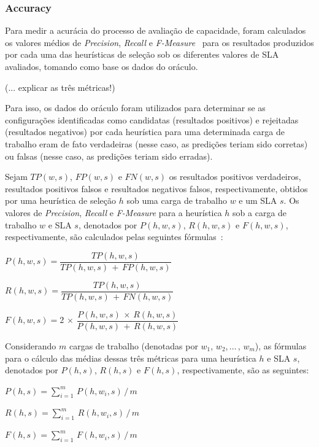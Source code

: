 \documentclass[10pt,conference,compsocconf]{IEEEtran}
\begin{document}
\subsubsection{Accuracy}

\unboldmath

Para medir a acurácia do processo de avaliação de capacidade, foram calculados os valores médios de \emph{Precision}, \emph{Recall} e \emph{F-Measure}~\cite{Baeza-Yates1999} para os resultados produzidos por cada uma das heurísticas de seleção sob os diferentes valores de SLA avaliados, tomando como base os dados do oráculo.  

(... explicar as três métricas!)

Para isso, os dados do oráculo foram utilizados para determinar se as configurações identificadas como candidatas (resultados positivos) e rejeitadas (resultados negativos) por cada heurística para uma determinada carga de trabalho eram de fato verdadeiras (nesse caso, as predições teriam sido corretas) ou falsas (nesse caso, as predições teriam sido erradas).

Sejam $TP(w,s)$, $FP(w,s)$ e $FN(w,s)$ os resultados positivos verdadeiros, resultados positivos falsos e resultados negativos falsos, respectivamente, obtidos por uma heurística de seleção $h$ sob uma carga de trabalho $w$ e um SLA $s$. Os valores de \emph{Precision}, \emph{Recall} e \emph{F-Measure} para a heurística $h$ sob a carga de trabalho $w$ e SLA $s$, denotados por $P(h,w,s)$, $R(h,w,s)$ e $F(h,w,s)$, respectivamente, são calculados pelas seguintes fórmulas~\cite{Baeza-Yates1999}:

{\scriptsize
  $P(h,w,s) = \dfrac{TP(h,w,s)}{TP(h,w,s)\,+\,FP(h,w,s)}$
  
 \smallskip
 $R(h,w,s) = \dfrac{TP(h,w,s)}{TP(h,w,s)\,+\,FN(h,w,s)}$
 
 \smallskip
  $F(h,w,s) = 2\,\times\,\dfrac{P(h,w,s)\,\times\,R(h,w,s)}{P(h,w,s)\,+\,R(h,w,s)}$
  }

Considerando $m$ cargas de trabalho (denotadas por $w_{1}$, $w_{2}$,\,$\ldots$\,, $w_{m}$), as fórmulas para o cálculo das médias dessas três métricas para uma heurística $h$ e SLA $s$,  denotados por $P(h,s)$, $R(h,s)$ e $F(h,s)$, respectivamente, são as seguintes: 

{\scriptsize
$P(h,s) = \sum\limits_{i=1}^{m}\,P(h,w_{i},s)\,/\,m$

\smallskip
%
$R(h,s) = \sum\limits_{i=1}^{m}\,R(h,w_{i},s)\,/\,m$

\smallskip
%
$F(h,s) = \sum\limits_{i=1}^{m}\,F(h,w_{i},s)\,/\,m$
}
\end{document}
